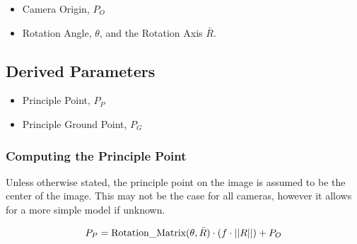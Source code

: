 \begin{itemize}
\item[] \gls{Camera Origin}, $P_O$
\item[] Rotation Angle, $\theta$, and the Rotation Axis $\bar{R}$.
\end{itemize}

\subsection*{Derived Parameters}

\begin{itemize}
\item[] \gls{Principle Point}, $P_P$
\item[] \gls{Principle Ground Point}, $P_G$
\end{itemize}

\subsubsection*{Computing the Principle Point}
Unless otherwise stated, the principle point on the image is assumed to be the center of the image. This may not be
the case for all cameras, however it allows for a more simple model if unknown. 

\begin{equation}
P_P = \textup{Rotation\_Matrix}(\theta, \bar{R}) \cdot \left( f \cdot ||R|| \right ) + P_O
\end{equation}

